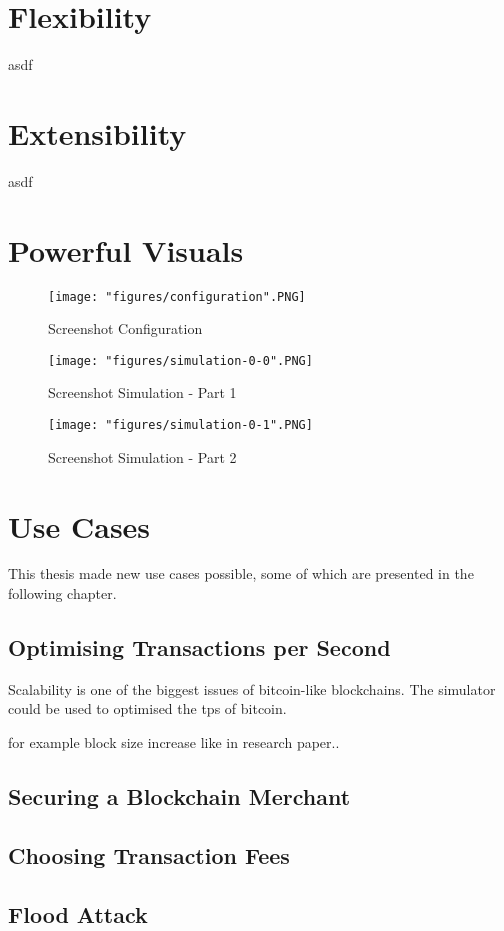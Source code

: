 \section{Flexibility}
asdf

\section{Extensibility}
asdf

\section{Powerful Visuals}

\begin{figure}[p]
\centering
\texttt{[image: "figures/configuration".PNG]}
\caption{Screenshot Configuration
\label{fig:configuration}}
\end{figure}

\begin{figure}[p]
\centering
\texttt{[image: "figures/simulation-0-0".PNG]}
\caption{Screenshot Simulation - Part 1
\label{fig:simulation1}}
\end{figure}

\begin{figure}[p]
\centering
\texttt{[image: "figures/simulation-0-1".PNG]}
\caption{Screenshot Simulation - Part 2
\label{fig:simulation2}}
\end{figure}

\section{Use Cases}
This thesis made new use cases possible, some of which are presented in the following chapter.

\subsection{Optimising Transactions per Second}
Scalability is one of the biggest issues of bitcoin-like blockchains. The simulator could be used to optimised the tps of bitcoin.

\cite{blocksizeincrease}

for example block size increase like in research paper..

\subsection{Securing a Blockchain Merchant}


\subsection{Choosing Transaction Fees}


\subsection{Flood Attack}

